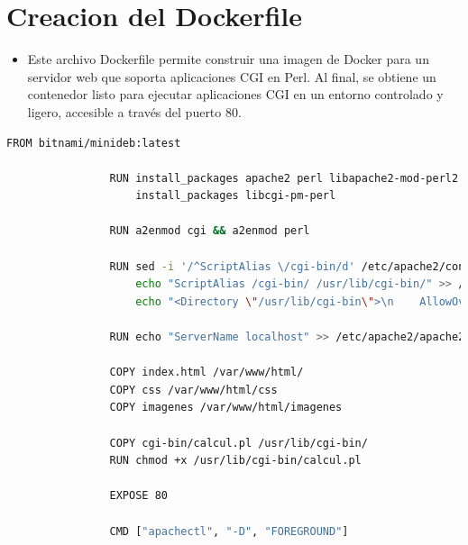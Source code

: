 \documentclass{article}
\begin{document}
    \section{Creacion del Dockerfile}
        \begin{itemize}
            \item Este archivo Dockerfile permite construir una imagen de Docker para un servidor web que soporta aplicaciones CGI en Perl. Al final, se obtiene un contenedor listo para ejecutar aplicaciones CGI en un entorno controlado y ligero, accesible a través del puerto 80.
        \end{itemize}

         \begin{lstlisting}[language=bash,caption={}, label={lst:color-boton}]
                FROM bitnami/minideb:latest

                RUN install_packages apache2 perl libapache2-mod-perl2 && \
                    install_packages libcgi-pm-perl
                
                RUN a2enmod cgi && a2enmod perl
                
                RUN sed -i '/^ScriptAlias \/cgi-bin/d' /etc/apache2/conf-enabled/serve-cgi-bin.conf && \
                    echo "ScriptAlias /cgi-bin/ /usr/lib/cgi-bin/" >> /etc/apache2/conf-enabled/serve-cgi-bin.conf && \
                    echo "<Directory \"/usr/lib/cgi-bin\">\n    AllowOverride None\n    Options +ExecCGI\n    Require all granted\n</Directory>" >> /etc/apache2/conf-enabled/serve-cgi-bin.conf
                
                RUN echo "ServerName localhost" >> /etc/apache2/apache2.conf
                
                COPY index.html /var/www/html/
                COPY css /var/www/html/css
                COPY imagenes /var/www/html/imagenes
                
                COPY cgi-bin/calcul.pl /usr/lib/cgi-bin/
                RUN chmod +x /usr/lib/cgi-bin/calcul.pl
                
                EXPOSE 80
                
                CMD ["apachectl", "-D", "FOREGROUND"]

         \end{lstlisting}
    
\end{document}

